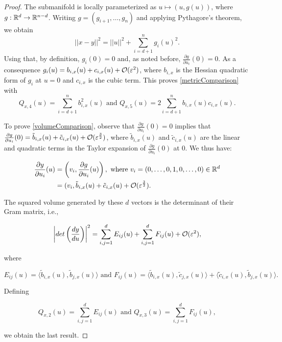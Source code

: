\begin{proof}
The submanifold is locally parameterized as $u\mapsto(u,g(u))$, where $g:\mathbb{R}^d\rightarrow\mathbb{R}^{n-d}$. Writing $g=(g_{i+1},\dots,g_n)$ and applying Pythagore's theorem, we obtain
\begin{equation*}
||x-y||^2=||u||^2+\sum_{i=d+1}^n g_i(u)^2.
\end{equation*}
Using that, by definition, $g_i(0)=0$ and, as noted before, $\frac{\partial g}{\partial u_i}(0)=0$. As a consequence $g_i(u)=b_{i,x}(u)+c_{i,x}(u)+\mathcal{O}(\varepsilon^2)$, where $b_{i,x}$ is the Hessian quadratic form of $g_i$ at $u=0$ and $c_{i,x}$ is the cubic term. This proves \eqref{metricComparison} with
\begin{equation*}
Q_{x,4}(u)=\sum_{i=d+1}^n b_{i,x}^2(u) \text{ and } Q_{x,5}(u)=2\sum_{i=d+1}^n b_{i,x}(u)c_{i,x}(u).
\end{equation*}

To prove \eqref{volumeComparison}, observe that $\frac{\partial g}{\partial u_i}(0)=0$ implies that $\frac{\partial g}{\partial u_i}(0)=\tilde{b}_{i,x}(u)+\tilde{c}_{i,x}(u)+\mathcal{O}(\varepsilon^\frac{3}{2})$, where $\tilde{b}_{i,x}(u)$ and $\tilde{c}_{i,x}(u)$ are the linear and quadratic terms in the Taylor expansion of $\frac{\partial g}{\partial u_i}(0)$ at $0$. We thus have:

\begin{equation*}\begin{align*}
\frac{\partial y}{\partial u_i}(u)&=\left(v_i,\frac{\partial g}{\partial u_i}(u)\right), \text{ where } v_i=(0,\dots,0,1,0,\dots,0)\in\mathbb{R}^d \\
&=(v_i,\tilde{b}_{i,x}(u)+\tilde{c}_{i,x}(u)+\mathcal{O}(\varepsilon^\frac{3}{2}).
\end{align*}\end{equation*}

The squared volume generated by these $d$ vectors is the determinant of their Gram matrix, i.e.,

\begin{equation*}
\left| det\left(\frac{dy}{du} \right)\right|^2=\sum_{i,j=1}^d E_{ij}(u)+\sum_{i,j=1}^d F_{ij}(u)+\mathcal{O}(\varepsilon^2),
\end{equation*}

where

\begin{equation*}
E_{ij}(u)=\langle \tilde{b}_{i,x}(u),\tilde{b}_{j,x}(u)\rangle \text{ and } F_{ij}(u)=\langle \tilde{b}_{i,x}(u),\tilde{c}_{j,x}(u)\rangle + \langle \tilde{c}_{i,x}(u),\tilde{b}_{j,x}(u)\rangle.
\end{equation*}

Defining

\begin{equation*}
Q_{x,2}(u)=\sum_{i,j=1}^d E_{ij}(u) \text{ and } Q_{x,3}(u)=\sum_{i,j=1}^d F_{ij}(u),
\end{equation*}

we obtain the last result.
\end{proof}



